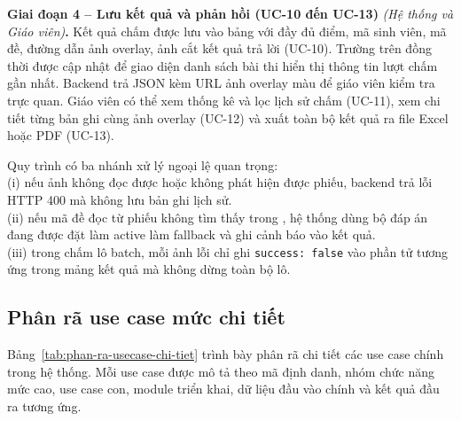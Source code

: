 \textbf{Giai đoạn 4 -- Lưu kết quả và phản hồi (UC-10 đến UC-13)} \textit{(Hệ thống và Giáo viên)}\textbf{.}
Kết quả chấm được lưu vào bảng  với đầy đủ điểm, mã sinh viên, mã đề, đường dẫn ảnh overlay, ảnh cắt kết quả trả lời (UC-10). Trường  trên  đồng thời được cập nhật để giao diện danh sách bài thi hiển thị thông tin lượt chấm gần nhất. Backend trả JSON kèm URL ảnh overlay màu để giáo viên kiểm tra trực quan. Giáo viên có thể xem thống kê và lọc lịch sử chấm (UC-11), xem chi tiết từng bản ghi cùng ảnh overlay (UC-12) và xuất toàn bộ kết quả ra file Excel hoặc PDF (UC-13).

Quy trình có ba nhánh xử lý ngoại lệ quan trọng:\\
(i) nếu ảnh không đọc được hoặc không phát hiện được phiếu, backend trả lỗi HTTP 400 mà không lưu bản ghi lịch sử. \\
(ii) nếu mã đề đọc từ phiếu không tìm thấy trong , hệ thống dùng bộ đáp án đang được đặt làm active làm fallback và ghi cảnh báo vào kết quả.\\ 
(iii) trong chấm lô batch, mỗi ảnh lỗi chỉ ghi \texttt{success: false} vào phần tử tương ứng trong mảng kết quả mà không dừng toàn bộ lô. 

\subsection{Phân rã use case mức chi tiết}
Bảng~\ref{tab:phan-ra-usecase-chi-tiet} trình bày phân rã chi tiết các use case chính trong hệ thống. Mỗi use case được mô tả theo mã định danh, nhóm chức năng mức cao, use case con, module triển khai, dữ liệu đầu vào chính và kết quả đầu ra tương ứng.

\scriptsize
\setlength{\tabcolsep}{3pt}
\renewcommand{\arraystretch}{1.25}

